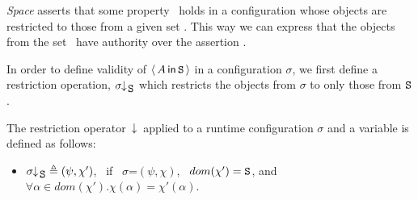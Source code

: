  
\vspace{.2cm} 

\noindent
\textit{Space} asserts that some property \A\ holds in a configuration whose objects are restricted to those
from a given set \SF. This way we can express that the objects from the set \SF\ have authority over the assertion \A.

In order to define validity of $\langle\, A\, \mathsf{in}\, {\mbox{\tt{S}}}\, \rangle$ in a configuration $\sigma$, 
we first define a restriction operation,  $\sigma\!\!\downarrow\!_{{\mbox{\tt{S}}}}$ which restricts the objects from $\sigma$ to only those
from ${{\mbox{\tt{S}}}}$.

\begin{definition}  \label{def:restrict}
The restriction operator~$\;\!\!\downarrow\!_{} $ applied to a runtime configuration $\sigma$ and a variable   is defined as follows:
 \label{def:config:restrct}
 $~ $
\begin{itemize}
\item
$\sigma\!\!\downarrow\!_{{\mbox{\tt{S}}}}  \triangleq  (\psi, \chi')$, \ if \  $\sigma$=$(\psi,\chi)$, \    $dom(\chi')={\mbox{\tt{S}}}$, and   
 $\forall \alpha\!\in\!dom(\chi').\chi(\alpha)=\chi'(\alpha)$.
\end{itemize}
\end{definition}


